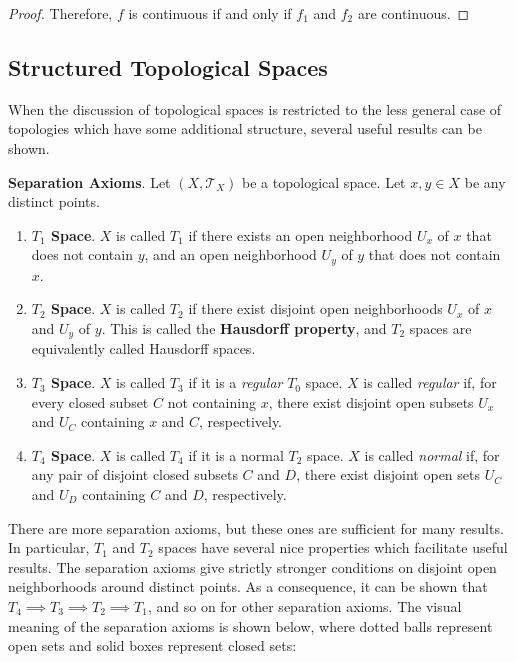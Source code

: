 \begin{framed}
\begin{proof}
    Therefore, $f$ is continuous if and only if $f_1$ and $f_2$ are continuous.
\end{proof}
\end{framed}
\vspace{-2em}
\subsection{Structured Topological Spaces}

When the discussion of topological spaces is restricted to the less general case of topologies which have some additional structure, several useful results can be shown. 

\begin{framed}
    \textbf{Separation Axioms}. Let $(X,\mathcal{T}_X)$ be a topological space. Let $x,y\in X$ be any distinct points.
    \begin{enumerate}
        \item[] \textbf{$T_1$ Space}. $X$ is called $T_1$ if there exists an open neighborhood $U_x$ of $x$ that does not contain $y$, and an open neighborhood $U_y$ of $y$ that does not contain $x$.
        \item[] \textbf{$T_2$ Space}. $X$ is called $T_2$ if there exist disjoint open neighborhoods $U_x$ of $x$ and $U_y$ of $y$. This is called the \textbf{Hausdorff property}, and $T_2$ spaces are equivalently called Hausdorff spaces.
        \item[] \textbf{$T_3$ Space}. $X$ is called $T_3$ if it is a \textit{regular} $T_0$ space. $X$ is called \textit{regular} if, for every closed subset $C$ not containing $x$, there exist disjoint open subsets $U_x$ and $U_C$ containing $x$ and $C$, respectively.
        \item[] \textbf{$T_4$ Space}. $X$ is called $T_4$ if it is a normal $T_2$ space. $X$ is called \textit{normal} if, for any pair of disjoint closed subsets $C$ and $D$, there exist disjoint open sets $U_C$ and $U_D$ containing $C$ and $D$, respectively.
    \end{enumerate}
    There are more separation axioms, but these ones are sufficient for many results. In particular, $T_1$ and $T_2$ spaces have several nice properties which facilitate useful results. The separation axioms give strictly stronger conditions on disjoint open neighborhoods around distinct points. As a consequence, it can be shown that $T_4\implies T_3\implies T_2\implies T_1$, and so on for other separation axioms. The visual meaning of the separation axioms is shown below, where dotted balls represent open sets and solid boxes represent closed sets:
    \begin{center}
    \begin{tikzpicture}[scale=1]


\end{tikzpicture}
\end{center}
\end{framed}
